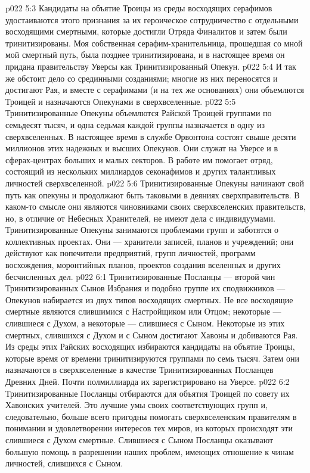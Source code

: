 \vs p022 5:3 Кандидаты на объятие Троицы из среды восходящих серафимов удостаиваются этого признания за их героическое сотрудничество с отдельными восходящими смертными, которые достигли Отряда Финалитов и затем были тринитизированы. Моя собственная серафим\hyp{}хранительница, прошедшая со мной мой смертный путь, была позднее тринитизирована, и в настоящее время он придана правительству Уверсы как Тринитизированный Опекун.
\vs p022 5:4 И так же обстоит дело со срединными созданиями; многие из них переносятся и достигают Рая, и вместе с серафимами (и на тех же основаниях) они объемлются Троицей и назначаются Опекунами в сверхвселенные.
\vs p022 5:5 Тринитизированные Опекуны объемлются Райской Троицей группами по семьдесят тысяч, и одна седьмая каждой группы назначается в одну из сверхвселенных. В настоящее время в службе Орвонтона состоят свыше десяти миллионов этих надежных и высших Опекунов. Они служат на Уверсе и в сферах\hyp{}центрах больших и малых секторов. В работе им помогает отряд, состоящий из нескольких миллиардов секонафимов и других талантливых личностей сверхвселенной.
\vs p022 5:6 Тринитизированные Опекуны начинают свой путь как опекуны и продолжают быть таковыми в деяниях сверхправительств. В каком\hyp{}то смысле они являются чиновниками своих сверхвселенских правительств, но, в отличие от Небесных Хранителей, не имеют дела с индивидуумами. Тринитизированные Опекуны занимаются проблемами групп и заботятся о коллективных проектах. Они --- хранители записей, планов и учреждений; они действуют как попечители предприятий, групп личностей, программ восхождения, моронтийных планов, проектов создания вселенных и других бесчисленных дел.
\vs p022 6:1 Тринитизированные Посланцы --- второй чин Тринитизированных Сынов Избрания и подобно группе их сподвижников --- Опекунов набирается из двух типов восходящих смертных. Не все восходящие смертные являются слившимися с Настройщиком или Отцом; некоторые --- слившиеся с Духом, а некоторые --- слившиеся с Сыном. Некоторые из этих смертных, слившихся с Духом и с Сыном достигают Хавоны и добиваются Рая. Из среды этих Райских восходящих избираются кандидаты на объятие Троицы, которые время от времени тринитизируются группами по семь тысяч. Затем они назначаются в сверхвселенные в качестве Тринитизированных Посланцев Древних Дней. Почти полмиллиарда их зарегистрировано на Уверсе.
\vs p022 6:2 Тринитизированные Посланцы отбираются для объятия Троицей по совету их Хавонских учителей. Это лучшие умы своих соответствующих групп и, следовательно, больше всего пригодны помогать сверхвселенским правителям в понимании и удовлетворении интересов тех миров, из которых происходят эти слившиеся с Духом смертные. Слившиеся с Сыном Посланцы оказывают большую помощь в разрешении наших проблем, имеющих отношение к чинам личностей, слившихся с Сыном.
